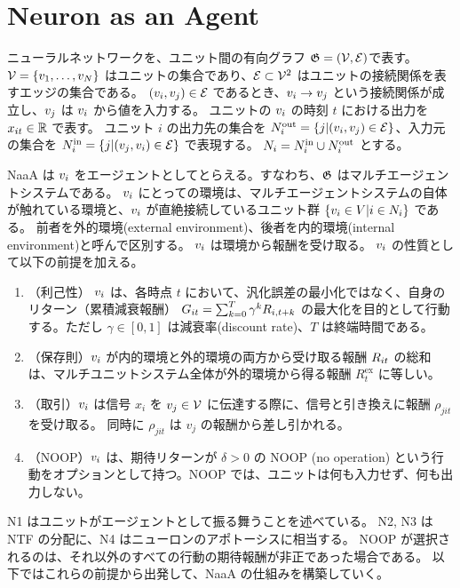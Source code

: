 \section{Neuron as an Agent}
ニューラルネットワークを、ユニット間の有向グラフ $\mathfrak{G} = (\mathcal{V}, \mathcal{E})$で表す。
$\mathcal{V} = \{v_{1}, \dots, v_{N}\}$ はユニットの集合であり、$\mathcal{E} \subset \mathcal{V}^2$ はユニットの接続関係を表すエッジの集合である。
$(v_{i}, v_{j}) \in \mathcal{E}$ であるとき、$v_{i} \rightarrow v_{j}$ という接続関係が成立し、$v_{j}$ は $v_{i}$ から値を入力する。
ユニットの $v_{i}$ の時刻 $t$ における出力を $x_{it} \in \mathbb{R}$ で表す。
ユニット $i$ の出力先の集合を $N^\mathrm{out}_i = \{j | (v_{i}, v_{j}) \in \mathcal{E} \}$、入力元の集合を $N^\mathrm{in}_i = \{j | (v_{j}, v_{i}) \in \mathcal{E} \}$ で表現する。
$N_i = N^\mathrm{in}_i \cup N^\mathrm{out}_i$ とする。

NaaA は $v_{i}$ をエージェントとしてとらえる。すなわち、$\mathfrak{G}$ はマルチエージェントシステムである。
$v_{i}$ にとっての環境は、マルチエージェントシステムの自体が触れている環境と、$v_{i}$ が直絶接続しているユニット群 $\{v_i \in V | i \in N_i\}$ である。
前者を外的環境(external environment)、後者を内的環境(internal environment)と呼んで区別する。
$v_{i}$ は環境から報酬を受け取る。
$v_{i}$ の性質として以下の前提を加える。
\begin{enumerate}
\renewcommand{\labelenumi}{N\arabic{enumi}:}
\item （利己性）
	$v_{i}$ は、各時点 $t$ において、汎化誤差の最小化ではなく、自身のリターン（累積減衰報酬）
	$G_{it} = \sum_{k=0}^T \gamma^k R_{i,t+k} $ の最大化を目的として行動する。ただし $\gamma \in [0, 1]$ は減衰率(discount rate)、$T$ は終端時間である。
\item （保存則）$v_{i}$ が内的環境と外的環境の両方から受け取る報酬 $R_{it}$ の総和は、マルチユニットシステム全体が外的環境から得る報酬 $R_t^{\mathrm{ex}}$ に等しい。
\item （取引）$v_{i}$ は信号 $x_i$ を $v_{j} \in \mathcal{V}$ に伝達する際に、信号と引き換えに報酬 $\rho_{jit}$ を受け取る。
	同時に $\rho_{jit}$ は $v_j$ の報酬から差し引かれる。
\item （NOOP）$v_{i}$ は、期待リターンが $\delta > 0$ の NOOP (no operation) という行動をオプションとして持つ。NOOP では、ユニットは何も入力せず、何も出力しない。
\end{enumerate}
N1 はユニットがエージェントとして振る舞うことを述べている。
N2, N3 は NTF の分配に、N4 はニューロンのアポトーシスに相当する。
NOOP が選択されるのは、それ以外のすべての行動の期待報酬が非正であった場合である。
以下ではこれらの前提から出発して、NaaA の仕組みを構築していく。

